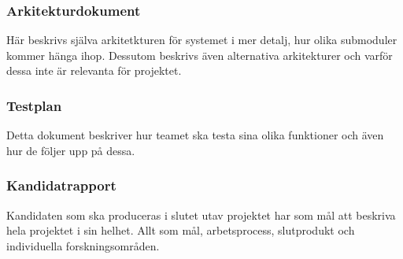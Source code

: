 \subsubsection*{Arkitekturdokument}
Här beskrivs själva arkitetkturen för systemet i mer detalj, hur olika submoduler kommer hänga
ihop. Dessutom beskrivs även alternativa arkitekturer och varför dessa inte är relevanta för
projektet.

\subsubsection*{Testplan}
Detta dokument beskriver hur teamet ska testa sina olika funktioner och även hur de följer upp på
dessa.

\subsubsection*{Kandidatrapport}
Kandidaten som ska produceras i slutet utav projektet har som mål att beskriva hela projektet i
sin helhet. Allt som mål, arbetsprocess, slutprodukt och individuella forskningsområden.

